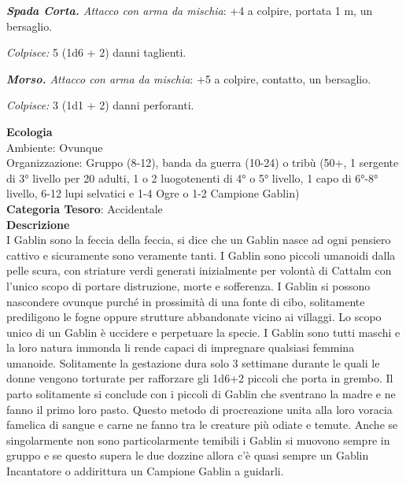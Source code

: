 \begin{multicols}{2}
{\emph{\textbf{Spada Corta.} Attacco con arma da mischia}: +4 a colpire, portata 1 m, un bersaglio.

\emph{Colpisce:} 5 (1d6 + 2) danni taglienti.

\emph{\textbf{Morso.} Attacco con arma da mischia}: +5 a colpire, contatto, un bersaglio.

\emph{Colpisce:} 3 (1d1 + 2) danni perforanti.

\textbf{Ecologia}\\
Ambiente: Ovunque\\
Organizzazione: Gruppo (8-12), banda da guerra (10-24) o tribù (50+, 1 sergente di 3° livello per 20 adulti, 1 o 2 luogotenenti di 4° o 5° livello, 1 capo di 6°-8° livello, 6-12 lupi selvatici e 1-4 Ogre o 1-2 Campione Gablin)\\
\textbf{Categoria Tesoro}: Accidentale\\
\textbf{Descrizione}\\
I Gablin sono la feccia della feccia, si dice che un Gablin nasce ad ogni pensiero cattivo e sicuramente sono veramente tanti.
I Gablin sono piccoli umanoidi dalla pelle scura, con striature verdi generati inizialmente per volontà di Cattalm con l'unico scopo di portare distruzione, morte e sofferenza.
I Gablin si possono nascondere ovunque purché in prossimità di una fonte di cibo, solitamente prediligono le fogne oppure strutture abbandonate vicino ai villaggi.
Lo scopo unico di un Gablin è uccidere e perpetuare la specie. I Gablin sono tutti maschi e la loro natura immonda li rende capaci di impregnare qualsiasi femmina umanoide.
Solitamente la gestazione dura solo 3 settimane durante le quali le donne vengono torturate per rafforzare gli 1d6+2 piccoli che porta in grembo. Il parto solitamente si conclude con i piccoli di Gablin che sventrano la madre e ne fanno il primo loro pasto.
Questo metodo di procreazione unita alla loro voracia famelica di sangue e carne ne fanno tra le creature più odiate e temute.
Anche se singolarmente non sono particolarmente temibili i Gablin si muovono sempre in gruppo e se questo supera le due dozzine allora c'è quasi sempre un Gablin Incantatore o addirittura un Campione Gablin a guidarli.

}
\end{multicols}
